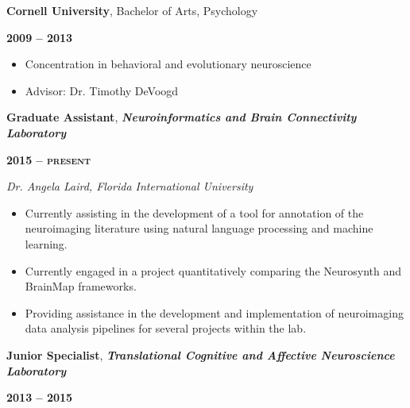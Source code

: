 \documentclass[10pt]{article}
\newcommand{\sectionstyle}{\LARGE \fontfamily{pcr}\selectfont}
\begin{document}
\bigskip

\begin{minipage}[t]{.7\linewidth}
\flushleft
\noindent
\textbf{Cornell University}, Bachelor of Arts, Psychology
\end{minipage}
\hfill
\begin{minipage}[t]{.3\linewidth}
\flushright
\noindent
\textsc{\textbf{2009 -- 2013}}
\end{minipage}

\begin{itemize}[noitemsep, nolistsep]
\item
  Concentration in behavioral and evolutionary neuroscience
\item
  Advisor: Dr. Timothy DeVoogd
\end{itemize}

\bigskip

\begin{center}\sectionstyle{EXPERIENCE}\end{center}

\begin{minipage}[t]{.8\linewidth}
\flushleft
\noindent
\textbf{Graduate Assistant}, \emph{\textbf{Neuroinformatics and Brain Connectivity Laboratory}}
\end{minipage}
\hfill
\begin{minipage}[t]{.2\linewidth}
\flushright
\noindent
\textsc{\textbf{2015 -- present}}
\end{minipage}

\emph{Dr. Angela Laird, Florida International University}

\begin{itemize}[noitemsep, nolistsep]
\item
  Currently assisting in the development of a tool for annotation of the
  neuroimaging literature using natural language processing and machine
  learning.
\item
  Currently engaged in a project quantitatively comparing the Neurosynth
  and BrainMap frameworks.
\item
  Providing assistance in the development and implementation of
  neuroimaging data analysis pipelines for several projects within the
  lab.
\end{itemize}

\bigskip

\begin{minipage}[t]{.85\linewidth}
\flushleft
\noindent
\textbf{Junior Specialist}, \emph{\textbf{Translational Cognitive and Affective Neuroscience Laboratory}}
\end{minipage}
\hfill
\begin{minipage}[t]{.15\linewidth}
\flushright
\noindent
\textsc{\textbf{2013 -- 2015}}
\end{minipage}
\end{document}
